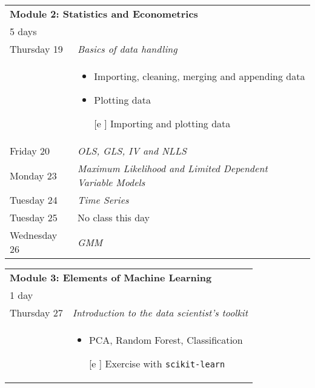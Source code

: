 \documentclass{amsart}
\theoremstyle{definition}
\theoremstyle{remark}
\numberwithin{equation}{section}
\begin{document}
\begin{center}
        \begin{tabular}{| p{3cm} | p{12cm} |}
    \hline
    \multicolumn{2}{|l|}{\textbf{Module 2: Statistics and Econometrics}} \\
    \multicolumn{2}{|l|}{5 days} \\
    \hline
    Thursday 19 & \textit{Basics of data handling} \\
        & \begin{itemize}
                \item Importing, cleaning, merging and appending data
                \item Plotting data
                \item [[e]] Importing and plotting data
            \end{itemize}
            \\
    Friday 20 & \textit{OLS, GLS, IV and NLLS}\\
    Monday 23 & \textit{Maximum Likelihood and Limited Dependent Variable Models}\\
    Tuesday 24 & \textit{Time Series}\\
    Tuesday 25 & No class this day\\
    Wednesday 26 & \textit{GMM} \\
\hline
    \end{tabular}
\end{center}

\begin{center}
    \begin{tabular}{| p{3cm} | p{12cm} |}
    \hline
    \multicolumn{2}{|l|}{\textbf{Module 3: Elements of Machine Learning}} \\
    \multicolumn{2}{|l|}{1 day} \\
    \hline
    Thursday 27 & \textit{Introduction to the data scientist's toolkit} \\
        & \begin{itemize}
                \item PCA, Random Forest, Classification
                \item [[e]] Exercise with \texttt{scikit-learn}
            \end{itemize} \\
    \hline
    \end{tabular}

\end{center}

\begin{center}
    
\end{center}
\end{document}
